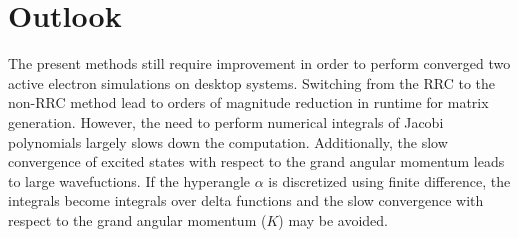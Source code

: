 \section{Outlook} %
\label{sec:outlook}
The present methods still require improvement in order to perform converged two active electron simulations on desktop systems. Switching from the RRC to the non-RRC method lead to orders of magnitude reduction in runtime for matrix generation. However, the need to perform numerical integrals of Jacobi polynomials largely slows down the computation. Additionally, the slow convergence of excited states with respect to the grand angular momentum leads to large wavefuctions.  If the hyperangle $\alpha$ is discretized using finite difference, the integrals become integrals over delta functions and the slow convergence with respect to the grand angular momentum ($K$) may be avoided. 
